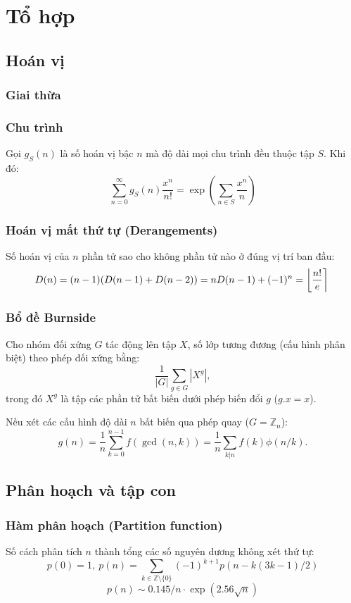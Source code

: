 \chapter{Tổ hợp}

\section{Hoán vị}
	\subsection{Giai thừa}
		

	\subsection{Chu trình}
		Gọi $g_S(n)$ là số hoán vị bậc $n$ mà độ dài mọi chu trình đều thuộc tập $S$. Khi đó:
		$$\sum_{n=0} ^\infty g_S(n) \frac{x^n}{n!} = \exp\left(\sum_{n\in S} \frac{x^n} {n} \right)$$

	\subsection{Hoán vị mất thứ tự (Derangements)}
		Số hoán vị của $n$ phần tử sao cho không phần tử nào ở đúng vị trí ban đầu:
		\[ \mkern-2mu D(n) = (n-1)(D(n-1)+D(n-2)) = n D(n-1)+(-1)^n = \left\lfloor\frac{n!}{e}\right\rceil \]

	\subsection{Bổ đề Burnside}
		Cho nhóm đối xứng $G$ tác động lên tập $X$, số lớp tương đương (cấu hình phân biệt) theo phép đối xứng bằng:
		 \[ {\frac {1}{|G|}}\sum _{{g\in G}}|X^{g}|, \]
		 trong đó $X^{g}$ là tập các phần tử bất biến dưới phép biến đổi $g$ ($g.x = x$).

		 Nếu xét các cấu hình độ dài $n$ bất biến qua phép quay ($G = \mathbb Z_n$):
		 \[ g(n) = \frac 1 n \sum_{k=0}^{n-1}{f(\gcd(n, k))} = \frac 1 n \sum_{k|n}{f(k)\phi(n/k)}. \]

\section{Phân hoạch và tập con}
	\subsection{Hàm phân hoạch (Partition function)}
		Số cách phân tích $n$ thành tổng các số nguyên dương không xét thứ tự:
		\[ p(0) = 1,\ p(n) = \sum_{k \in \mathbb Z \setminus \{0\}}{(-1)^{k+1} p(n - k(3k-1) / 2)} \]
		\[ p(n) \sim 0.145 / n \cdot \exp(2.56 \sqrt{n}) \]

